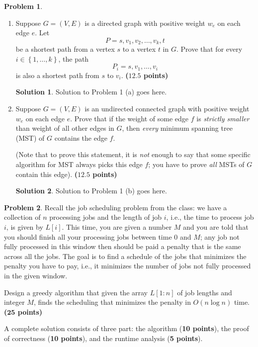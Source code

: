 \documentclass{article}
\theoremstyle{definition}
\newtheorem{problem}{Problem}
\newtheorem*{solution*}{Solution}
\newenvironment{solution}{\begin{solution*}}{{} \end{solution*}}
\newcommand{\grade}[1]{\hfill{\textbf{($\mathbf{#1}$ points)}}}
\newcommand{\set}[1]{\ensuremath{\left\{ #1 \right\}}}
\begin{document}
\begin{problem}\label{basics}~
\begin{enumerate}[label=(\alph*)]
	\item  Suppose $G=(V,E)$ is a directed graph with positive weight $w_e$ on each edge $e$. Let 
	\[
	P=s,v_1,v_2,\ldots,v_k,t
	\]
	 be a shortest path from a vertex $s$ to a vertex $t$ in $G$. Prove that for every $i \in \set{1,\ldots,k}$, 
	the path 
	\[
	P_i = s, v_1,\ldots,v_i
	\]
	is also a shortest path from $s$ to $v_i$. \grade{12.5} 
	
	\bigskip
\begin{solution}
Solution to Problem 1 (a) goes here. 
\end{solution}
	
	\newpage
	\item 
	Suppose $G = (V,E)$ is an undirected connected graph with positive weight $w_e$ on each edge $e$. Prove that if the weight of some edge $f$ is \emph{strictly smaller} than weight of  all other edges in $G$, then \emph{every} minimum spanning tree (MST) of $G$ contains the edge $f$. 
	
	(Note that to prove this statement, it is \emph{not} enough
	to say that some specific algorithm for MST always picks this edge $f$; you have to prove \emph{all} MSTs of $G$ contain this edge). 
	 \grade{12.5}
	 
	 \bigskip
	 

\begin{solution}
Solution to Problem 1 (b) goes here. 
\end{solution}

	\vspace*{\fill}
\end{enumerate}



\end{problem}

\newpage

\begin{problem}
	Recall the job scheduling problem from the class: we have a collection of $n$ processing jobs and the length of job $i$, i.e., the time to process job $i$, is given by $L[i]$. This time, you are given a number $M$ and you are told that you should finish all your processing jobs between time $0$ and $M$; any job not fully processed in this window then should be paid a penalty that is the same across all the jobs. The goal is to find a schedule of the jobs that minimizes the penalty you have to pay, i.e., it minimizes the number of jobs not fully processed in the given window. 
	
	Design a greedy algorithm that given the array $L[1:n]$ of job lengths and integer $M$, finds the scheduling that minimizes the penalty in $O(n\log{n})$ time. \grade{25}

	A complete solution consists of three part: the algorithm (\textbf{10 points}), the proof of correctness (\textbf{10 points}), 
	and the runtime analysis (\textbf{5 points}). 

\end{problem}
\end{document}
